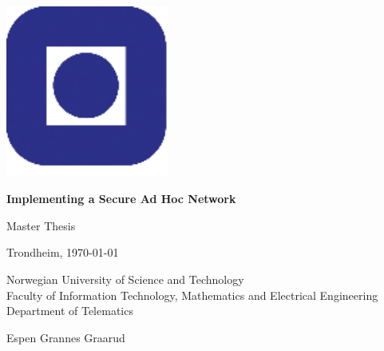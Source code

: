 \begin{titlepage}
 
	\parindent=0cm
	\addtolength{\parskip}{\baselineskip}

	\includegraphics[width=0.4\textwidth]{images/NTNU_logo.png}
	\vspace{2cm}\vspace{0.5cm}
	
	{\Huge \textbf{Implementing a Secure Ad Hoc Network}}

	{\LARGE Master Thesis}
	
	\vspace{1.5cm}	

	\vfill
	
	{\normalsize Trondheim, \today
	
	Norwegian University of Science and Technology\\
	Faculty of Information Technology, Mathematics and Electrical Engineering \\
	Department of Telematics}
	\vspace{2cm}\vspace{0.75cm}

	{\large Espen Grannes Graarud}
	

\end{titlepage}
